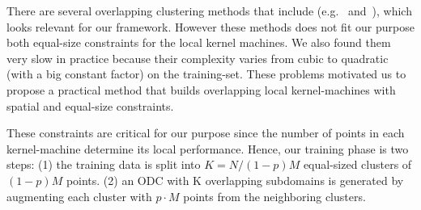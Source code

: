 There are several overlapping clustering methods that include (e.g.~\cite{perez2013oclustr} and~\cite{bonchi2013overlapping}), which looks relevant for our framework. However these methods does not fit our purpose both equal-size  constraints for the local kernel machines. We also found them very slow in practice because their complexity varies from cubic to quadratic (with a big constant factor) on the training-set. These problems motivated us to propose a practical method that builds overlapping local kernel-machines with spatial and equal-size constraints.  These constraints are critical for our purpose since the number of points in each kernel-machine determine its local performance. Hence,  our training phase is two steps: (1) the training data is split into $K= N/ (1-p) M$ equal-sized clusters of $(1-p) M$ points. (2) an ODC with K overlapping subdomains is generated by augmenting each cluster with $p \cdot M$ points from the neighboring clusters.

